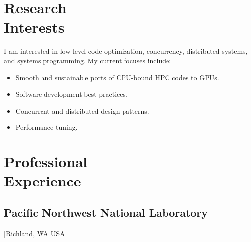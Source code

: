 \documentclass{mycv}
\begin{document}
\maketitle

\section{Research \\ Interests}

I am interested in low-level code optimization, concurrency, distributed systems, and systems programming.
My current focuses include:

\begin{itemize}
  \item Smooth and sustainable ports of CPU-bound HPC codes to GPUs.
  \item Software development best practices.
  \item Concurrent and distributed design patterns.
  \item Performance tuning.
\end{itemize}

\section{Professional \\ Experience}

\subsection{Pacific Northwest National Laboratory}[Richland, WA USA]
\begin{positions}
\end{positions}
\end{document}
